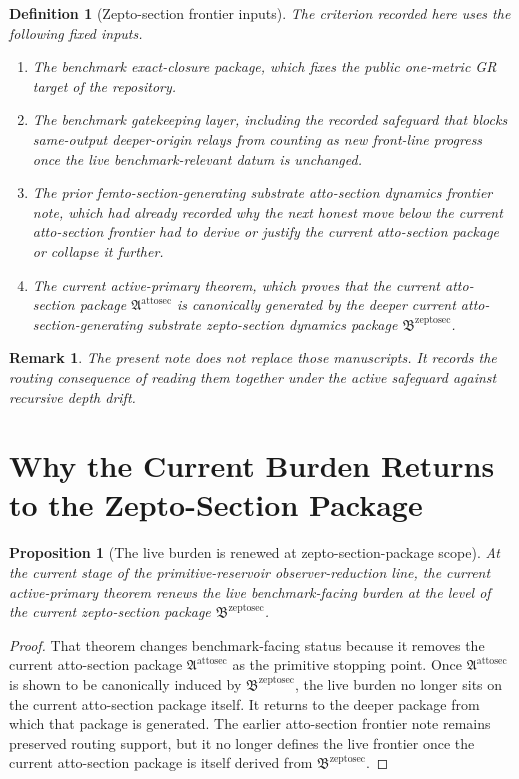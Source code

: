 \documentclass[11pt]{article}
\newcommand{\AttoSectionPackage}{\mathfrak A^{\mathrm{attosec}}}
\newcommand{\ZeptoSectionPackage}{\mathfrak B^{\mathrm{zeptosec}}}
\newtheorem{definition}{Definition}
\newtheorem{proposition}{Proposition}
\newtheorem{remark}{Remark}
\begin{document}
\begin{definition}[Zepto-section frontier inputs]
The criterion recorded here uses the following fixed inputs.
\begin{enumerate}
    \item The benchmark exact-closure package, which fixes the public one-metric GR target of the repository.
    \item The benchmark gatekeeping layer, including the recorded safeguard that blocks same-output deeper-origin relays from counting as new front-line progress once the live benchmark-relevant datum is unchanged.
    \item The prior femto-section-generating substrate atto-section dynamics frontier note, which had already recorded why the next honest move below the current atto-section frontier had to derive or justify the current atto-section package or collapse it further.
    \item The current active-primary theorem, which proves that the current atto-section package \(\AttoSectionPackage\) is canonically generated by the deeper current atto-section-generating substrate zepto-section dynamics package \(\ZeptoSectionPackage\).
\end{enumerate}
\end{definition}

\begin{remark}
The present note does not replace those manuscripts. It records the routing consequence of reading them together under the active safeguard against recursive depth drift.
\end{remark}

\section{Why the Current Burden Returns to the Zepto-Section Package}

\begin{proposition}[The live burden is renewed at zepto-section-package scope]
At the current stage of the primitive-reservoir observer-reduction line, the current active-primary theorem renews the live benchmark-facing burden at the level of the current zepto-section package \(\ZeptoSectionPackage\).
\end{proposition}

\begin{proof}
That theorem changes benchmark-facing status because it removes the current atto-section package \(\AttoSectionPackage\) as the primitive stopping point. Once \(\AttoSectionPackage\) is shown to be canonically induced by \(\ZeptoSectionPackage\), the live burden no longer sits on the current atto-section package itself. It returns to the deeper package from which that package is generated. The earlier atto-section frontier note remains preserved routing support, but it no longer defines the live frontier once the current atto-section package is itself derived from \(\ZeptoSectionPackage\).
\end{proof}
\end{document}
